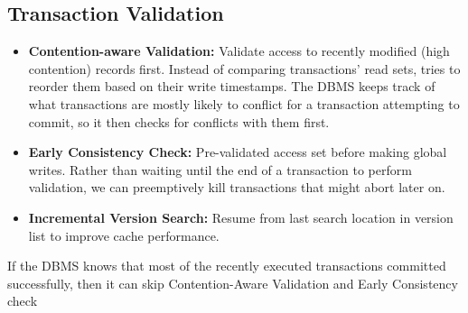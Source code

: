 \documentclass[11pt]{article}
\begin{document}
\subsection*{Transaction Validation}


\begin{itemize}
    \item \textbf{Contention-aware Validation:}
    Validate access to recently modified (high contention) records first. Instead of comparing 
    transactions' read sets,  tries to reorder them based on their write timestamps. 
    The DBMS keeps track of what transactions are mostly likely to conflict for a 
    transaction attempting to commit, so it then checks for conflicts with them first.
    
    \item \textbf{Early Consistency Check:}
    Pre-validated access set before making global writes. Rather than waiting until the end of 
    a transaction to perform validation, we can preemptively kill transactions that might abort 
    later on.
      
    \item \textbf{Incremental Version Search:}
    Resume from last search location in version list to improve cache performance.
\end{itemize}

If the DBMS knows that most of the recently executed transactions committed successfully,
then it can skip Contention-Aware Validation and Early Consistency check


\newpage


\end{document}
